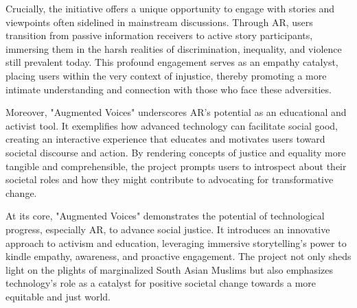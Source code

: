 \documentclass[manuscript,screen]{acmart}
\begin{document}
Crucially, the initiative offers a unique opportunity to engage with stories and viewpoints often sidelined in mainstream discussions. Through AR, users transition from passive information receivers to active story participants, immersing them in the harsh realities of discrimination, inequality, and violence still prevalent today. This profound engagement serves as an empathy catalyst, placing users within the very context of injustice, thereby promoting a more intimate understanding and connection with those who face these adversities.

Moreover, "Augmented Voices" underscores AR's potential as an educational and activist tool. It exemplifies how advanced technology can facilitate social good, creating an interactive experience that educates and motivates users toward societal discourse and action. By rendering concepts of justice and equality more tangible and comprehensible, the project prompts users to introspect about their societal roles and how they might contribute to advocating for transformative change.

At its core, "Augmented Voices" demonstrates the potential of technological progress, especially AR, to advance social justice. It introduces an innovative approach to activism and education, leveraging immersive storytelling's power to kindle empathy, awareness, and proactive engagement. The project not only sheds light on the plights of marginalized South Asian Muslims but also emphasizes technology's role as a catalyst for positive societal change towards a more equitable and just world.
\end{document}
